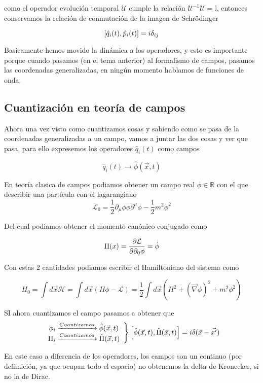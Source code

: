 como el operador evolución temporal $\mathcal{U}$ cumple la relación $\mathcal{U}^{-1}\mathcal{U}=\mathbb{I}$, entonces conservamos la relación de conmutación de la imagen de Schrödinger 

\[\comm{\hat{q}_{i}(t)}{\hat{p}_{i}(t)}=i\delta_{ij}\]

Basicamente hemos movido la dinámica a los operadores, y esto es importante porque cuando pasamos (en el tema anterior) al formalismo de campos, pasamos las coordenadas generalizadas, en ningún momento hablamos de funciones de onda. 

\subsection{Cuantización en teoría de campos}

Ahora una vez visto como cuantizamos cosas y sabiendo como se pasa de la coordenadas generalizadas a un campo, vamos a juntar las dos cosas y ver que pasa, para ello expresemos los operadores $\hat{q}_{i}(t)$ como campos

\[\hat{q}_{i}(t)\longrightarrow \hat{\phi}(\vec{x},t)\]

En teoría clasica de campos podiamos obtener un campo real $\phi \in \mathbb{R}$ con el que describir una partícula con el lagarangiano 
\[\mathcal{L}_{0}=\frac{1}{2}\partial_{\mu}\phi\phi \partial^{\mu}\phi-\frac{1}{2}m^{2}\phi^{2}\]

Del cual podiamos obtener el momento canónico conjugado como 

\[\Pi(x)=\pdv{\mathcal{L}}{\partial_{0}\phi}= \dot{\phi}\]

Con estas 2 cantidades podiamos escribir el Hamiltoniano del sistema como 

\[H_{0}=\int d \vec{x}\mathcal{H}=\int d \vec{x}(\Pi \phi-\mathcal{L})=\frac{1}{2}\int d \vec{x}(\Pi^{2}+(\vec{\nabla}\phi)^{2}+m^{2}\phi^{2})\]

SI ahora cuantizamos el campo pasamos a obtener que 
\[\left.\begin{array}{c}
  \phi_{i} \xrightarrow{Cuantizamos}\hat{\phi}(\vec{x},t) \\
  \Pi_{i} \xrightarrow{Cuantizamos}\hat{\Pi}(\vec{x},t)
\end{array}\right\} \comm{\hat{\phi}(\vec{x},t)}{\hat{\Pi}(\vec{x},t)}=i\delta(\vec{x}-\vec{x'})\]

En este caso a diferencia de los operadores, los campos son un continuo (por defiinición, ya que ocupan todo el espacio) no obtenemos la delta de Kronecker, si no la de Dirac. 

